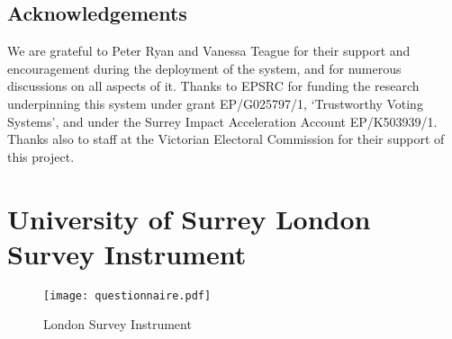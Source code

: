 \documentclass[twocolumn]{article}
\begin{document}
\subsection*{Acknowledgements}
We are grateful to Peter Ryan and Vanessa Teague for their support and encouragement during the deployment of the system, and for numerous discussions on all aspects of it.   Thanks to EPSRC for funding the research underpinning this system under grant EP/G025797/1, `Trustworthy Voting Systems', and under the Surrey Impact Acceleration Account EP/K503939/1.  Thanks also to staff at the Victorian Electoral Commission for their support of this project.




\appendix

\section{University of Surrey London Survey Instrument} 
\label{app:survey}

\begin{figure*}
\texttt{[image: questionnaire.pdf]}
\caption{London Survey Instrument}
\end{figure*}
\end{document}
